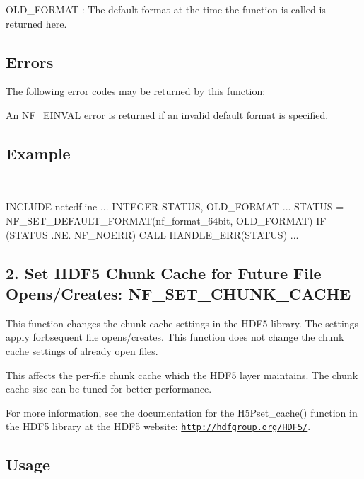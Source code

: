 {\ttfamily O\+L\+D\+\_\+\+F\+O\+R\+M\+AT} \+: The default format at the time the function is called is returned here.

\subsection*{Errors }

The following error codes may be returned by this function\+:


\begin{DoxyItemize}
\item An N\+F\+\_\+\+E\+I\+N\+V\+AL error is returned if an invalid default format is specified.
\end{DoxyItemize}

\subsection*{Example }

 

I\+N\+C\+L\+U\+DE \textquotesingle{}netcdf.\+inc\textquotesingle{} ... I\+N\+T\+E\+G\+ER S\+T\+A\+T\+US, O\+L\+D\+\_\+\+F\+O\+R\+M\+AT ... S\+T\+A\+T\+US = N\+F\+\_\+\+S\+E\+T\+\_\+\+D\+E\+F\+A\+U\+L\+T\+\_\+\+F\+O\+R\+M\+A\+T(nf\+\_\+format\+\_\+64bit, O\+L\+D\+\_\+\+F\+O\+R\+M\+A\+T) IF (S\+T\+A\+T\+US .NE. N\+F\+\_\+\+N\+O\+E\+RR) C\+A\+LL H\+A\+N\+D\+L\+E\+\_\+\+E\+R\+R(\+S\+T\+A\+T\+U\+S) ...\hypertarget{nc_f77_interface_guide_f77_Set-HDF5-Chunk}{}\subsection{2. Set H\+D\+F5 Chunk Cache for Future File Opens/\+Creates\+: N\+F\+\_\+\+S\+E\+T\+\_\+\+C\+H\+U\+N\+K\+\_\+\+C\+A\+C\+H\+E }\label{nc_f77_interface_guide_f77_Set-HDF5-Chunk}
This function changes the chunk cache settings in the H\+D\+F5 library. The settings apply forbsequent file opens/creates. This function does not change the chunk cache settings of already open files.

This affects the per-\/file chunk cache which the H\+D\+F5 layer maintains. The chunk cache size can be tuned for better performance.

For more information, see the documentation for the H5\+Pset\+\_\+cache() function in the H\+D\+F5 library at the H\+D\+F5 website\+: \href{http://hdfgroup.org/HDF5/}{\tt http\+://hdfgroup.\+org/\+H\+D\+F5/}.

\subsection*{Usage }

